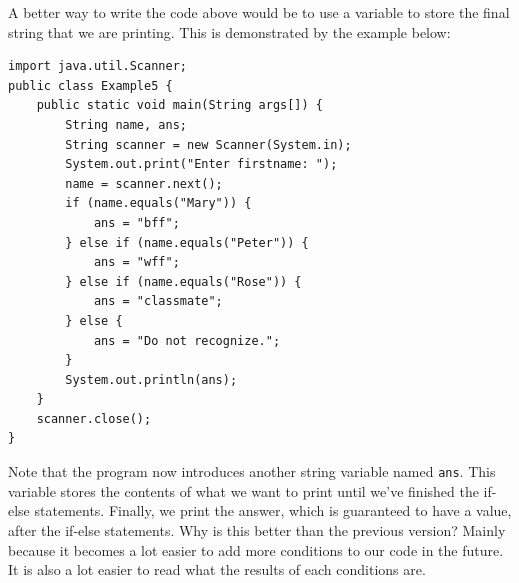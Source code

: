 A better way to write the code above would be to use a variable to store the final string that we are printing. This is demonstrated by the example below:

\begin{lstlisting}
import java.util.Scanner;
public class Example5 {
    public static void main(String args[]) {
        String name, ans;
        String scanner = new Scanner(System.in);
        System.out.print("Enter firstname: ");
        name = scanner.next();
        if (name.equals("Mary")) {
            ans = "bff";
        } else if (name.equals("Peter")) {
            ans = "wff";
        } else if (name.equals("Rose")) {
            ans = "classmate";
        } else {
            ans = "Do not recognize.";
        }
        System.out.println(ans);
    }
    scanner.close();
}
\end{lstlisting}

Note that the program now introduces another string variable named \verb!ans!. This variable stores the contents of what we want to print until we've finished the if-else statements. Finally, we print the answer, which is guaranteed to have a value, after the if-else statements. Why is this better than the previous version? Mainly because it becomes a lot easier to add more conditions to our code in the future. It is also a lot easier to read what the results of each conditions are. 
